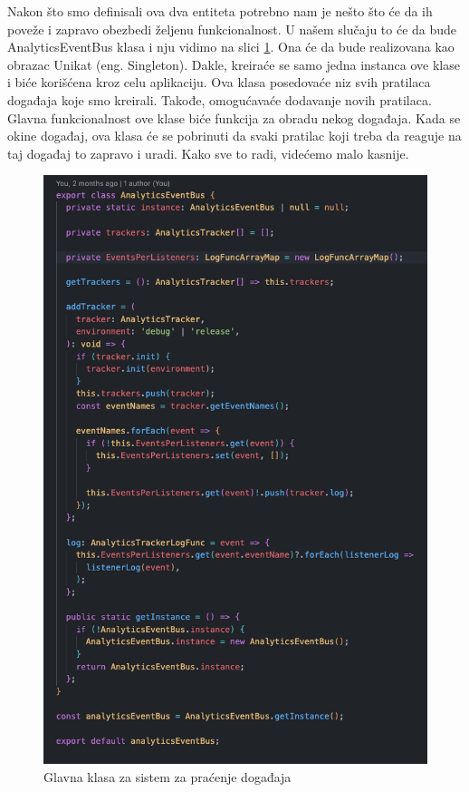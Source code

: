 \documentclass[12pt,oneside]{memoir}
\begin{document}
Nakon što smo definisali ova dva entiteta potrebno nam je nešto što će da ih poveže i zapravo obezbedi željenu funkcionalnost. U našem slučaju to će da bude AnalyticsEventBus klasa i nju vidimo na slici \ref{fig:analyticsEventBus}. Ona će da bude realizovana kao obrazac Unikat\cite{singleton} (eng. Singleton). Dakle, kreiraće se samo jedna instanca ove klase i biće korišćena kroz celu aplikaciju. Ova klasa posedovaće niz svih pratilaca događaja koje smo kreirali. Takođe, omogućavaće dodavanje novih pratilaca. Glavna funkcionalnost ove klase biće funkcija za obradu nekog događaja. Kada se okine događaj, ova klasa će se pobrinuti da svaki pratilac koji treba da reaguje na taj događaj to zapravo i uradi. Kako sve to radi, videćemo malo kasnije.

\begin{figure}[h!]
\centering
\includegraphics[scale=0.45]{docs/images/chapterSix/analyticsEventBus.png}
\caption{Glavna klasa za sistem za praćenje događaja}
\label{fig:analyticsEventBus}
\end{figure}
\end{document}
